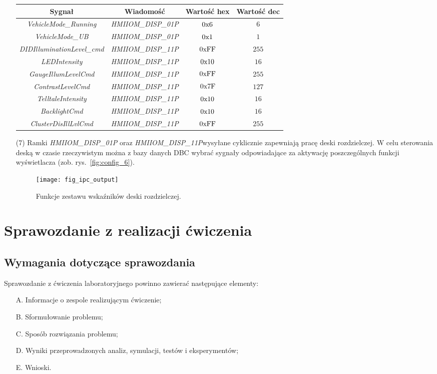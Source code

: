 \documentclass[11pt,onecolumn]{article}
\begin{document}
\begin{itemize}
\begin{table}[!ht]
\label{tab:messages}
\centering
\begin{tabular}{|c|c|c|c|}
\hline
\textbf{Sygnał} & \textbf{Wiadomość} & \textbf{Wartość hex} & \textbf{Wartość dec} \\
\hline
\hline
\emph{VehicleMode\_Running} & \emph{HMIIOM\_DISP\_01P} & ${\rm 0x6}$ & $6$\\
\hline
\emph{VehicleMode\_UB} & \emph{HMIIOM\_DISP\_01P} & ${\rm 0x1}$ & $1$\\
\hline
\emph{DIDIlluminationLevel\_cmd} & \emph{HMIIOM\_DISP\_11P} & ${\rm 0xFF}$ & $255$\\
\hline
\emph{LEDIntensity} & \emph{HMIIOM\_DISP\_11P} & ${\rm 0x10}$ & $16$\\
\hline
\emph{GaugeIllumLevelCmd} & \emph{HMIIOM\_DISP\_11P} & ${\rm 0xFF}$ & $255$\\
\hline
\emph{ContrastLevelCmd} & \emph{HMIIOM\_DISP\_11P} & ${\rm 0x7F}$ & $127$\\
\hline
\emph{TelltaleIntensity} & \emph{HMIIOM\_DISP\_11P} & ${\rm 0x10}$ & $16$\\
\hline
\emph{BacklightCmd} & \emph{HMIIOM\_DISP\_11P} & ${\rm 0x10}$ & $16$\\
\hline
\emph{ClusterDisIllLvlCmd} & \emph{HMIIOM\_DISP\_11P} & ${\rm 0xFF}$ & $255$\\
\hline
\end{tabular}
\end{table}
%
\item[(7)] Ramki \emph{HMIIOM\_DISP\_01P} oraz \emph{HMIIOM\_DISP\_11P}wysyłane cyklicznie zapewniają pracę deski rozdzielczej. W celu sterowania deską w czasie rzeczywistym można z bazy danych DBC wybrać sygnały odpowiadające za aktywację poszczególnych funkcji wyświetlacza (zob. rys.~\ref{fig:config_6}).
%
\begin{figure}[!ht]
   \centering
   \texttt{[image: fig\_ipc\_output]}
   \caption{Funkcje zestawu wskaźników deski rozdzielczej.}
   \label{fig:ipc_output}
\end{figure}
%
\end{itemize}
\section{Sprawozdanie z realizacji ćwiczenia} \label{sec:sprawozdanie}
%
\subsection{Wymagania dotyczące sprawozdania} \label{sub:wymagania}
%
Sprawozdanie z ćwiczenia laboratoryjnego powinno zawierać następujące elementy:
\begin{itemize}
 \item[A.] Informacje o zespole realizującym ćwiczenie;
 \item[B.] Sformułowanie problemu;
 \item[C.] Sposób rozwiązania problemu;
 \item[D.] Wyniki przeprowadzonych analiz, symulacji, testów i eksperymentów;
 \item[E.] Wnioski.
\end{itemize}
%
\end{document}
